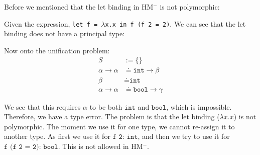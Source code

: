 \noindent
Before we mentioned that the let binding in HM$^-$ is not polymorphic:
\begin{Example}

\label{ex:let-not-poly}
    
Given the expression, \texttt{let f = $\lambda$x.x in f (f\ 2 = 2)}. We can see that the let binding does not have a principal type:

\vspace{1em}
\Large
{}
\normalsize

\vspace{1em}
\noindent
Now onto the unification problem:
\begin{align*}
    S&:=\{\}\\
    \alpha\to\alpha &\doteq \texttt{int}\to\beta\\
    \beta &\doteq \texttt{int}\\
    \alpha\to\alpha &\doteq \texttt{bool}\to\gamma
\end{align*}

\noindent
We see that this requires $\alpha$ to be both $\texttt{int}$ and $\texttt{bool}$, which is impossible. Therefore, we have a type error.
The problem is that the let binding ($\lambda x.x$) is not polymorphic. The moment we use it for one type, we cannot re-assign it to another type.
As first we use it for $\texttt{f 2: int}$, and then we try to use it for $\texttt{f (f\ 2 = 2): bool}$. This is not allowed in HM$^-$.
\end{Example}

